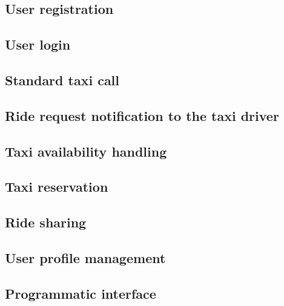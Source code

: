 \subsection{User registration}


\subsection{User login}


\subsection{Standard taxi call}


\subsection{Ride request notification to the taxi driver}


\subsection{Taxi availability handling}


\subsection{Taxi reservation}


\subsection{Ride sharing}


\subsection{User profile management}


\subsection{Programmatic interface}
